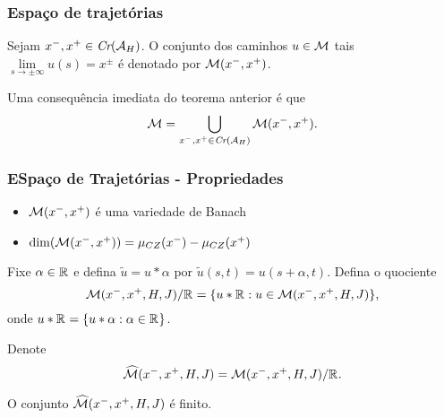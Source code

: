 \documentclass{beamer}
\begin{document}
	\begin{frame}
	\frametitle{Espaço de trajetórias}		
	Sejam $x^{-}, x^{+}\in \textit{Cr}(\mathcal{A}_{H})$. O conjunto dos caminhos $u \in \mathcal{M}$ tais $\lim\limits_{s\to \pm \infty}u(s) = x^{\pm}$ é denotado por $\mathcal{M}(x^{-}, x^{+})$.
			
			\begin{observacao}\label{observacao_uniao_orbitas_conectantes}
				Uma consequência imediata do teorema anterior é que 
				$$
				\mathcal{M} = \bigcup_{x^{-}, x^{+} \in \textit{Cr}(\mathcal{A}_{H})} \mathcal{M}(x^{-}, x^{+}).
				$$
			\end{observacao}
			
	\end{frame}
	
	\begin{frame}
		\frametitle{ESpaço de Trajetórias - Propriedades}
		\begin{itemize}
			\item $\mathcal{M}(x^{-}, x^{+})$ é uma variedade de Banach
			
			\item $\dim(\mathcal{M}(x^{-}, x^{+}))=\mu_{CZ}(x^{-})-\mu_{CZ}(x^{+})$
			
			
		\end{itemize}
		Fixe $\alpha \in \mathbb{R}^{}$ e defina $\tilde{u} = u*\alpha$ por $\tilde{u}(s,t) = u(s+\alpha,t)$.  Defina o quociente
		$$
		\mathcal{M}(x^{-},x^{+}, H, J)/\mathbb{R}^{}=\{u*\mathbb{R}^{}: u\in \mathcal{M}(x^{-},x^{+}, H, J)\},
		$$
		onde $u*\mathbb{R}^{} = \{u*\alpha:\alpha \in \mathbb{R}^{}\}$.
		
		
		Denote 
		$$
		\widehat{\mathcal{M}}(x^{-}, x^{+}, H, J) = \mathcal{M}(x^{-},x^{+}, H, J)/\mathbb{R}^{}.
		$$ 
		\begin{proposicao}
		O conjunto $\widehat{\mathcal{M}}(x^{-}, x^{+}, H, J)$ é finito.
		\end{proposicao}
	\end{frame}
	
\end{document}
